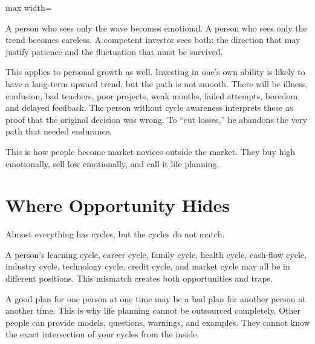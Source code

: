 \begin{center}
\begin{adjustbox}{max width=\linewidth}
\end{adjustbox}
\end{center}

A person who sees only the wave becomes emotional. A person who sees only the trend becomes careless. A competent investor sees both: the direction that may justify patience and the fluctuation that must be survived.

This applies to personal growth as well. Investing in one's own ability is likely to have a long-term upward trend, but the path is not smooth. There will be illness, confusion, bad teachers, poor projects, weak months, failed attempts, boredom, and delayed feedback. The person without cycle awareness interprets these as proof that the original decision was wrong. To ``cut losses,'' he abandons the very path that needed endurance.

This is how people become market novices outside the market. They buy high emotionally, sell low emotionally, and call it life planning.

\section*{Where Opportunity Hides}

Almost everything has cycles, but the cycles do not match.

A person's learning cycle, career cycle, family cycle, health cycle, cash-flow cycle, industry cycle, technology cycle, credit cycle, and market cycle may all be in different positions. This mismatch creates both opportunities and traps.

A good plan for one person at one time may be a bad plan for another person at another time. This is why life planning cannot be outsourced completely. Other people can provide models, questions, warnings, and examples. They cannot know the exact intersection of your cycles from the inside.

